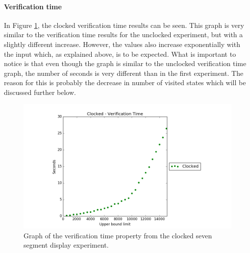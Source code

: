 \paragraph{Verification time}
In Figure \ref{fig:clocked_verification}, the clocked verification time
results can be seen.
This graph is very similar to the verification time results for the unclocked experiment, but with a slightly different increase. However, the values also increase exponentially with the input which, as explained above, is to be expected. What is important to notice is that even though the graph is similar to the unclocked verification time graph, the number of seconds is very different than in the first experiment. The reason for this is probably the decrease in number of visited states which will be discussed further below.
\begin{figure}
    \centering
    \includegraphics[scale=0.6]{./figures/plots/clocked_verification_time.png}
\caption{Graph of the verification time property from the clocked seven segment display experiment.}
\label{fig:clocked_verification}
\end{figure}

